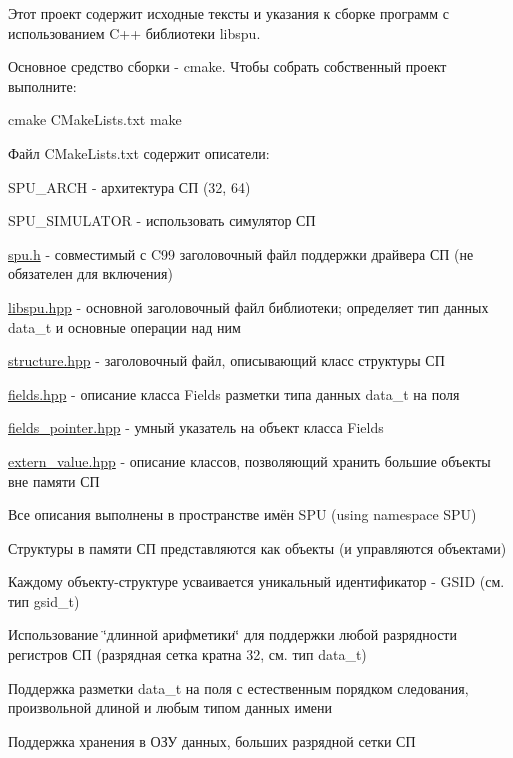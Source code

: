 Этот проект содержит исходные тексты и указания к сборке программ с использованием C++ библиотеки {\ttfamily libspu}.

Основное средство сборки -\/ {\ttfamily cmake}. Чтобы собрать собственный проект выполните\+:


\begin{DoxyCode}
cmake CMakeLists.txt
make
\end{DoxyCode}


Файл {\ttfamily C\+Make\+Lists.\+txt} содержит описатели\+:
\begin{DoxyItemize}
\item {\ttfamily S\+P\+U\+\_\+\+A\+R\+CH} -\/ архитектура СП (32, 64)
\item {\ttfamily S\+P\+U\+\_\+\+S\+I\+M\+U\+L\+A\+T\+OR} -\/ использовать симулятор СП
\end{DoxyItemize}


\begin{DoxyItemize}
\item {\ttfamily \hyperlink{spu_8h_source}{spu.\+h}} -\/ совместимый с C99 заголовочный файл поддержки драйвера СП (не обязателен для включения)
\item {\ttfamily \hyperlink{libspu_8hpp_source}{libspu.\+hpp}} -\/ основной заголовочный файл библиотеки; определяет тип данных data\+\_\+t и основные операции над ним
\item {\ttfamily \hyperlink{structure_8hpp_source}{structure.\+hpp}} -\/ заголовочный файл, описывающий класс структуры СП
\item {\ttfamily \hyperlink{fields_8hpp_source}{fields.\+hpp}} -\/ описание класса Fields разметки типа данных data\+\_\+t на поля
\item {\ttfamily \hyperlink{fields__pointer_8hpp_source}{fields\+\_\+pointer.\+hpp}} -\/ умный указатель на объект класса Fields
\item {\ttfamily \hyperlink{extern__value_8hpp_source}{extern\+\_\+value.\+hpp}} -\/ описание классов, позволяющий хранить большие объекты вне памяти СП
\end{DoxyItemize}


\begin{DoxyEnumerate}
\item Все описания выполнены в пространстве имён S\+PU ({\ttfamily using namespace S\+PU})
\item Структуры в памяти СП представляются как объекты (и управляются объектами)
\item Каждому объекту-\/структуре усваивается уникальный идентификатор -\/ G\+S\+ID (см. тип gsid\+\_\+t)
\item Использование \char`\"{}длинной арифметики\char`\"{} для поддержки любой разрядности регистров СП (разрядная сетка кратна 32, см. тип {\ttfamily data\+\_\+t})
\item Поддержка разметки {\ttfamily data\+\_\+t} на поля с естественным порядком следования, произвольной длиной и любым типом данных имени
\item Поддержка хранения в ОЗУ данных, больших разрядной сетки СП 


\end{DoxyEnumerate}

